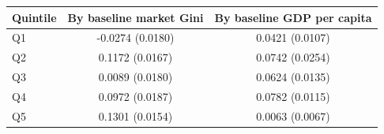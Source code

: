 \begin{tabular}{lcc}
\toprule
Quintile & By baseline market Gini & By baseline GDP per capita \\
\midrule
Q1 & -0.0274 (0.0180) & 0.0421\sym{***} (0.0107) \\
Q2 & 0.1172\sym{***} (0.0167) & 0.0742\sym{***} (0.0254) \\
Q3 & 0.0089 (0.0180) & 0.0624\sym{***} (0.0135) \\
Q4 & 0.0972\sym{***} (0.0187) & 0.0782\sym{***} (0.0115) \\
Q5 & 0.1301\sym{***} (0.0154) & 0.0063 (0.0067) \\
\bottomrule
\end{tabular}
